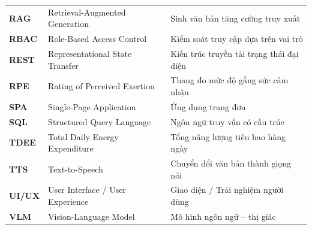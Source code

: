 \begin{table}[htbp]
\begin{tabularx}{\textwidth}{l p{7.2cm} >{\raggedright\arraybackslash}X}
    \textbf{RAG}   & Retrieval-Augmented Generation       & Sinh văn bản tăng cường truy xuất \\
    \textbf{RBAC}  & Role-Based Access Control            & Kiểm soát truy cập dựa trên vai trò \\
    \textbf{REST}  & Representational State Transfer      & Kiến trúc truyền tải trạng thái đại diện \\
    \textbf{RPE}   & Rating of Perceived Exertion         & Thang đo mức độ gắng sức cảm nhận \\
    \textbf{SPA}   & Single-Page Application              & Ứng dụng trang đơn \\
    \textbf{SQL}   & Structured Query Language            & Ngôn ngữ truy vấn có cấu trúc \\
    \textbf{TDEE}  & Total Daily Energy Expenditure       & Tổng năng lượng tiêu hao hàng ngày \\
    \textbf{TTS}   & Text-to-Speech                       & Chuyển đổi văn bản thành giọng nói \\
    \textbf{UI/UX} & User Interface / User Experience     & Giao diện / Trải nghiệm người dùng \\
    \textbf{VLM}   & Vision-Language Model                & Mô hình ngôn ngữ -- thị giác \\
    \bottomrule
\end{tabularx}
\end{table}

\clearpage
